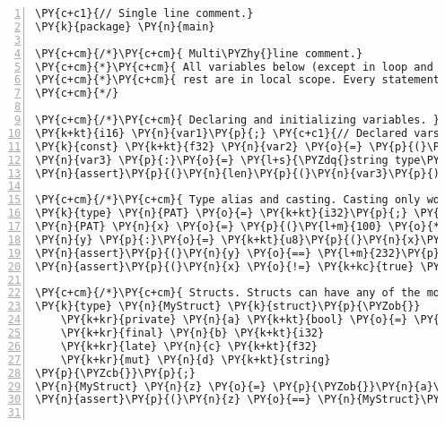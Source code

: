 \begin{Verbatim}[commandchars=\\\{\},numbers=left,firstnumber=1,stepnumber=1]
\PY{c+c1}{// Single line comment.}
\PY{k}{package} \PY{n}{main}

\PY{c+cm}{/*}\PY{c+cm}{ Multi\PYZhy{}line comment.}
\PY{c+cm}{*}\PY{c+cm}{ All variables below (except in loop and function body) are in global scope. The}
\PY{c+cm}{*}\PY{c+cm}{ rest are in local scope. Every statement of code must end in a semicolon.}
\PY{c+cm}{*/}

\PY{c+cm}{/*}\PY{c+cm}{ Declaring and initializing variables. }\PY{c+cm}{*/}
\PY{k+kt}{i16} \PY{n}{var1}\PY{p}{;} \PY{c+c1}{// Declared vars. must specify type}
\PY{k}{const} \PY{k+kt}{f32} \PY{n}{var2} \PY{o}{=} \PY{p}{(}\PY{o}{\PYZhy{}}\PY{l+m}{1.50}\PY{n}{f}\PY{p}{)}\PY{p}{;} \PY{c+c1}{// Constant var init. Negatives must be wrapped in ().}
\PY{n}{var3} \PY{p}{:}\PY{o}{=} \PY{l+s}{\PYZdq{}string type\PYZdq{}}\PY{p}{;} \PY{c+c1}{// Walrus operator infers type from right hand side.}
\PY{n}{assert}\PY{p}{(}\PY{n}{len}\PY{p}{(}\PY{n}{var3}\PY{p}{)} \PY{o}{==} \PY{l+m}{11}\PY{p}{)}\PY{p}{;} \PY{c+c1}{// len(.) gets length of string.}

\PY{c+cm}{/*}\PY{c+cm}{ Type alias and casting. Casting only works b}\PY{c+cm}{/}\PY{c+cm}{t primitives. See LRM. }\PY{c+cm}{*/}
\PY{k}{type} \PY{n}{PAT} \PY{o}{=} \PY{k+kt}{i32}\PY{p}{;} \PY{c+c1}{// Type alias for signed 32\PYZhy{}bit int.}
\PY{n}{PAT} \PY{n}{x} \PY{o}{=} \PY{p}{(}\PY{l+m}{100} \PY{o}{*} \PY{l+m}{10}\PY{p}{)} \PY{o}{+} \PY{l+m}{1}\PY{p}{;}
\PY{n}{y} \PY{p}{:}\PY{o}{=} \PY{k+kt}{u8}\PY{p}{(}\PY{n}{x}\PY{p}{)}\PY{p}{;} \PY{c+c1}{// Casting. Signed 32\PYZhy{}bit int \PYZhy{}\PYZhy{}\PYZgt{} unsigned 8\PYZhy{}bit int.}
\PY{n}{assert}\PY{p}{(}\PY{n}{y} \PY{o}{==} \PY{l+m}{232}\PY{p}{)}\PY{p}{;} \PY{c+c1}{// Due to truncation.}
\PY{n}{assert}\PY{p}{(}\PY{n}{x} \PY{o}{!=} \PY{k+kc}{true} \PY{o}{\PYZam{}\PYZam{}} \PY{k+kt}{bool}\PY{p}{(}\PY{n}{x}\PY{p}{)} \PY{o}{==} \PY{k+kc}{true}\PY{p}{)}\PY{p}{;} \PY{c+c1}{// Only bool types can be true or false.}

\PY{c+cm}{/*}\PY{c+cm}{ Structs. Structs can have any of the modifiers shown below. See LRM. }\PY{c+cm}{*/}
\PY{k}{type} \PY{n}{MyStruct} \PY{k}{struct}\PY{p}{\PYZob{}}
    \PY{k+kr}{private} \PY{n}{a} \PY{k+kt}{bool} \PY{o}{=} \PY{k+kc}{false} \PY{c+c1}{// Can initialize value.}
    \PY{k+kr}{final} \PY{n}{b} \PY{k+kt}{i32}
    \PY{k+kr}{late} \PY{n}{c} \PY{k+kt}{f32}
    \PY{k+kr}{mut} \PY{n}{d} \PY{k+kt}{string}
\PY{p}{\PYZcb{}}\PY{p}{;}
\PY{n}{MyStruct} \PY{n}{z} \PY{o}{=} \PY{p}{\PYZob{}}\PY{n}{a}\PY{p}{:}\PY{k+kc}{true}\PY{p}{,} \PY{n}{b}\PY{p}{:}\PY{l+m}{123}\PY{p}{,} \PY{n}{c}\PY{p}{:}\PY{l+m}{4.56}\PY{p}{,} \PY{n}{d}\PY{p}{:}\PY{l+s}{\PYZdq{}false\PYZdq{}}\PY{p}{\PYZcb{}}\PY{p}{;}
\PY{n}{assert}\PY{p}{(}\PY{n}{z} \PY{o}{==} \PY{n}{MyStruct}\PY{p}{)}\PY{p}{;}


\end{Verbatim}
